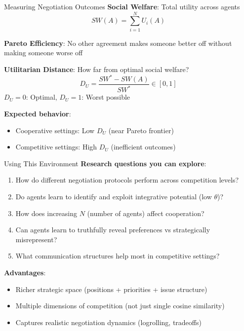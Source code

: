 \documentclass{beamer}
\begin{document}
\begin{frame}{Measuring Negotiation Outcomes}
\textbf{Social Welfare}: Total utility across agents
\begin{equation*}
SW(A) = \sum_{i=1}^{N} U_i(A)
\end{equation*}

\vspace{0.3cm}

\textbf{Pareto Efficiency}: No other agreement makes someone better off without making someone worse off

\vspace{0.3cm}

\textbf{Utilitarian Distance}: How far from optimal social welfare?
\begin{equation*}
D_U = \frac{SW^* - SW(A)}{SW^*} \in [0,1]
\end{equation*}
$D_U = 0$: Optimal, $D_U = 1$: Worst possible

\vspace{0.3cm}

\textbf{Expected behavior}:
\begin{itemize}
    \item Cooperative settings: Low $D_U$ (near Pareto frontier)
    \item Competitive settings: High $D_U$ (inefficient outcomes)
\end{itemize}
\end{frame}

\begin{frame}{Using This Environment}
\textbf{Research questions you can explore}:

\begin{enumerate}
    \item How do different negotiation protocols perform across competition levels?
    
    \item Do agents learn to identify and exploit integrative potential (low $\theta$)?
    
    \item How does increasing $N$ (number of agents) affect cooperation?
    
    \item Can agents learn to truthfully reveal preferences vs strategically misrepresent?
    
    \item What communication structures help most in competitive settings?
\end{enumerate}

\vspace{0.5cm}

\textbf{Advantages}:
\begin{itemize}
    \item Richer strategic space (positions + priorities + issue structure)
    \item Multiple dimensions of competition (not just single cosine similarity)
    \item Captures realistic negotiation dynamics (logrolling, tradeoffs)
\end{itemize}
\end{frame}
\end{document}
